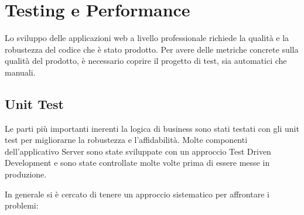 

\chapter{Testing e Performance}

Lo sviluppo delle applicazioni web a livello professionale richiede la qualità e la robustezza del codice che è stato prodotto. Per avere delle metriche concrete sulla qualità del prodotto, è necessario coprire il progetto di test, sia automatici che manuali.

\section{Unit Test}

Le parti più importanti inerenti la logica di business sono stati testati con gli unit test per migliorarne la robustezza e l'affidabilità. Molte componenti dell'applicativo Server sono state sviluppate con un approccio Test Driven Development e sono state controllate molte volte prima di essere messe in produzione.

\par In generale si è cercato di tenere un approccio sistematico per affrontare i problemi:

